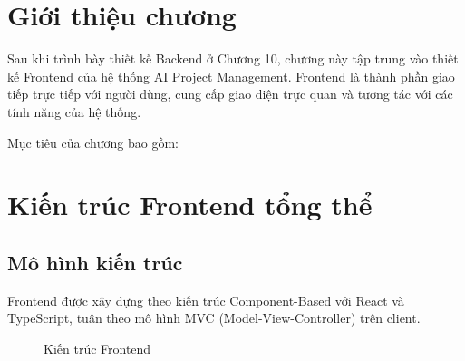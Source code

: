 \documentclass[12pt,a4paper]{report}
\begin{document}
\section{Giới thiệu chương}

Sau khi trình bày thiết kế Backend ở Chương 10, chương này tập trung vào thiết kế Frontend của hệ thống AI Project Management. Frontend là thành phần giao tiếp trực tiếp với người dùng, cung cấp giao diện trực quan và tương tác với các tính năng của hệ thống.

Mục tiêu của chương bao gồm:
\section{Kiến trúc Frontend tổng thể}

\subsection{Mô hình kiến trúc}

Frontend được xây dựng theo kiến trúc Component-Based với React và TypeScript, tuân theo mô hình MVC (Model-View-Controller) trên client.

\begin{figure}[H]
\centering
{}
\caption{Kiến trúc Frontend}
\label{fig:frontend_architecture}
\end{figure}
\end{document}
